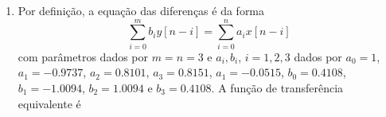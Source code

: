 \documentclass{article}
\begin{document}
\begin{enumerate}
Por meio da propriedade da transformada $\mathcal{Z}\{n X[n]\} \coloneqq -z \frac{d}{dz} X(z)$, segue
\begin{subequations}
\begin{equation}
x[n] = e^{-an} & \rightarrow -z \frac{d}{dz} \mathcal{Z}\{e^{-an}\} = \mathcal{Z}\{n e^{-an}\} \mbox{, } n = T_s i \mbox{, } i \in \mathbb{N}
\end{equation}
\begin{equation}
x[n] = n e^{-an} & \rightarrow -z \frac{d}{dz} \mathcal{Z}\{n e^{-an}\}} = \mathcal{Z}\{n^2 e^{-an}\} \mbox{, } n = T_s \mbox{, } i \in \mathbb{N}
\end{equation}
\end{subequations}
Logo
    \begin{equation}
    \begin{split}
    \mathcal{Z}\{e^{-an}\} & = \frac{1}{1 - e^{-a T_s} z^{-1}} \Rightarrow \\
    \frac{d}{dz} \mathcal{Z}\{e^{-an}\} & = - e^{-a T_s} \frac{z^{-2}}{(1 - e^{-a T_s} z^{-1})^2} \\
    \mathcal{Z}\{n e^{-an}\} \coloneqq -z \frac{d}{dz} \mathcal{Z}\{e^{-an}\} & = e^{-a T_s} \frac{z^{-1}}{(1 - e^{-a T_s} z^{-1})^2}
    \end{split}
    \end{equation}
e
    \begin{equation}
    \begin{split}
    \mathcal{Z}\{n e^{-an}\} & = e^{-a T_s} \frac{z^{-1}}{(1 - e^{-a T_s} z^{-1})^2} \Rightarrow \\ \frac{d}{dz} \mathcal{Z}\{n e^{-an}\} & = e^{- a T_s} \frac{z^{-2}(1 - e^{-a T_s} z^-1)^2 - 2(1 - e^{-a T_s} z^{-1}) e^{-a T_s} z^{-2}}{(1 - e^{-a T_s} z^{-1})^3} \\ 
    & = - e^{-a T_s} \frac{z^{-2} (1 + e^{-a T_s} z^{-1})}{(1 - e^{- a T_s} z^-1)^3}
    \end{split}
    \end{equation}
Portanto 
\begin{equation}
    \mathcal{Z}\{n^2 e^{-a n}\} \coloneqq -z \frac{d}{dz} \mathcal{Z}\{n e^{-a n}\} & = e^{-a T_s} \frac{z^{-1}(1 + e^{-a T_s} z^{-1})}{(1 - e^{-a T_s} z^{-1})}
\end{equation}
\item %
Por definição, a equação das diferenças é da forma
\begin{equation}
\sum_{i=0}^{m} b_i y[n-i] = \sum_{i=0}^{n} a_i x[n-i]
\end{equation}
com parâmetros dados por $m = n = 3$ e $a_i, b_i$, $i = 1, 2, 3$ dados por $a_0 = 1$, $a_1 = -0.9737$, $a_2 = 0.8101$, $a_3 = 0.8151$, $a_1 = -0.0515$, $b_0 = 0.4108$, $b_1 = -1.0094$, $b_2 = 1.0094$ e $b_3 = 0.4108$. A função de transferência equivalente é

\end{enumerate}
\end{document}
